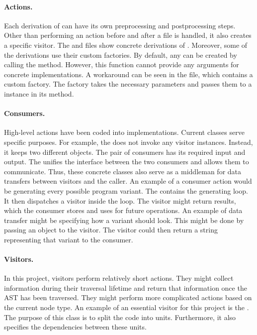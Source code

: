 \paragraph{Actions.} Each derivation of  can have 
its own preprocessing and postprocessing steps.
Other than performing an action before and after a file is handled, it also 
creates a specific visitor.
The  and  files show concrete derivations 
of .
Moreover, some of the derivations use their custom factories.
By default, any  can be created by calling 
the  method.
However, this function cannot provide any arguments for concrete 
 implementations.
A workaround can be seen in the  file, which contains 
a custom factory.
The factory takes the necessary parameters and passes them to 
a  instance in its  method.

\paragraph{Consumers.} High-level actions have been coded into 
 implementations.
Current  classes serve specific purposes.
For example, the   
does not invoke any visitor instances.
Instead, it keeps two different  objects.
The pair of consumers has its required input and output.
The  unifies the interface between the two 
consumers and allows them to communicate.
Thus, these concrete  classes also serve as a middleman for 
data transfers between visitors and the caller.
An example of a consumer action would be generating every possible program 
variant.
The  contains the generating loop.
It then dispatches a visitor inside the loop.
The visitor might return results, which the consumer stores and uses for 
future operations.
An example of data transfer might be specifying how a variant should look.
This might be done by passing an object to the visitor.
The visitor could then return a string representing that variant to 
the consumer.

\paragraph{Visitors.} In this project, visitors perform relatively short 
actions.
They might collect information during their traversal lifetime and return 
that information once the AST has been traversed.
They might perform more complicated  actions based on the 
current node type.
An example of an essential visitor for this project is 
the .
The purpose of this class is to split the code into units.
Furthermore, it also specifies the dependencies between these units.

